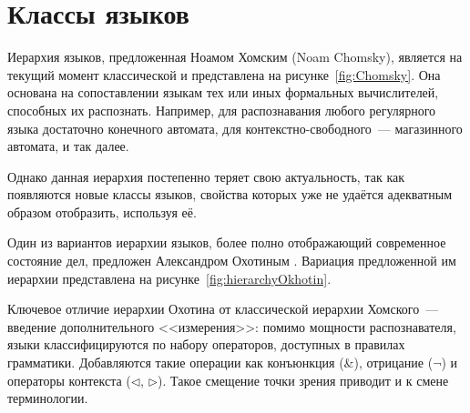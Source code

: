 \section{Классы языков}
\label{sec:LanguageClasses}

Иерархия языков, предложенная Ноамом Хомским (Noam Chomsky), является на текущий момент классической и представлена на рисунке~\ref{fig:Chomsky}.
Она основана на сопоставлении языкам тех или иных формальных вычислителей, способных их распознать.
Например, для распознавания любого регулярного языка достаточно конечного автомата, для контекстно-свободного~--- магазинного автомата, и так далее.

\begin{marginfigure}
    \begin{center}
        \resizebox{\marginparwidth}{!}{
            
        }
    \end{center}
    \caption{Иерархия языков по Хомскому}
    \label{fig:Chomsky}
\end{marginfigure}

Однако данная иерархия постепенно теряет свою актуальность, так как появляются новые классы языков, свойства которых уже не удаётся адекватным образом отобразить, используя её.

Один из вариантов иерархии языков, более полно отображающий современное состояние дел, предложен Александром Охотиным%
.
Вариация предложенной им иерархии%
 представлена на рисунке~\ref{fig:hierarchyOkhotin}.

Ключевое отличие иерархии Охотина от классической иерархии Хомского~--- введение дополнительного <<измерения>>: помимо мощности распознавателя, языки классифицируются по набору операторов, доступных в правилах грамматики.
Добавляются такие операции как конъюнкция (\&), отрицание ($\neg$) и операторы контекста ($\lhd$, $\rhd$).
Такое смещение точки зрения приводит и к смене терминологии.

